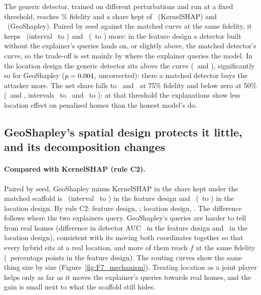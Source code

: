 The generic detector, trained on different perturbations and run at a fixed threshold, reaches
\FKernelSHAPGenFid\% fidelity and a share kept of \FKernelSHAPGenKept\ (KernelSHAP) and \FGeoShapleyGenKept\
(GeoShapley). Paired by seed against the matched curve at the same fidelity, it keeps \FKernelSHAPGenMinusCurve\
(interval \FKernelSHAPGenMinusCurveLo\ to \FKernelSHAPGenMinusCurveHi) and \FGeoShapleyGenMinusCurve\
(\FGeoShapleyGenMinusCurveLo\ to \FGeoShapleyGenMinusCurveHi) more: in the feature design a detector built without
the explainer's queries lands on, or slightly above, the matched detector's curve, so the trade-off is set mainly by
where the explainer queries the model. In the location design the generic detector sits above the curve
(\LKernelSHAPGenMinusCurve\ and \LGeoShapleyGenMinusCurve), significantly so for GeoShapley ($p =
0.004$, uncorrected): there a matched detector buys the attacker more. The net share falls to
\LKernelSHAPMatSeventyFiveKept\ and \LGeoShapleyMatSeventyFiveKept\ at 75\% fidelity and below zero at 50\%
(\LKernelSHAPMatFiftyKept\ and \LGeoShapleyMatFiftyKept, intervals \LKernelSHAPMatFiftyKeptLo\ to
\LKernelSHAPMatFiftyKeptHi\ and \LGeoShapleyMatFiftyKeptLo\ to \LGeoShapleyMatFiftyKeptHi): at that threshold the
explanations show less location effect on penalised homes than the honest model's do.

\tabinput{tab_frontier}

\subsection{GeoShapley's spatial design protects it little, and its decomposition changes}
\paragraph{Compared with KernelSHAP (rule C2).} Paired by seed, GeoShapley minus KernelSHAP in the share kept under the
matched scaffold is \FGeoMinusKsKept\ (interval \FGeoMinusKsKeptLo\ to \FGeoMinusKsKeptHi) in the feature design and
\LGeoMinusKsKept\ (\LGeoMinusKsKeptLo\ to \LGeoMinusKsKeptHi) in the location design. By rule C2: feature design,
\RuleCtwoFeatureGeoMinusKs; location design, \RuleCtwoLocationGeoMinusKs. The difference follows where the two
explainers query. GeoShapley's queries are harder to tell from real homes (difference in detector AUC
\FGeoMinusKsAuc\ in the feature design and \LGeoMinusKsAuc\ in the location design), consistent with its moving both
coordinates together so that every hybrid sits at a real location, and more of them reach $f$ at the same fidelity
(\FGeoMinusKsLeak\ percentage points in the feature design). The routing curves show the same thing size by size
(Figure~\ref{fig:F7_mechanism}). Treating location as a joint player helps only as far as it moves the explainer's
queries towards real homes, and the gain is small next to what the scaffold still hides.

